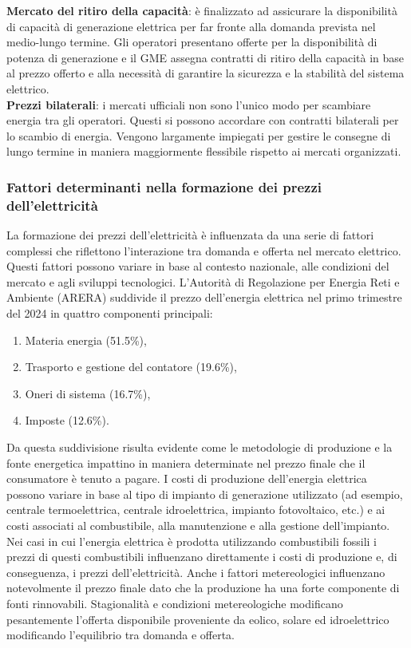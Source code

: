 \documentclass{article}
\begin{document}
\textbf{Mercato del ritiro della capacità}: è finalizzato ad assicurare la disponibilità di capacità di generazione elettrica per far fronte alla domanda prevista nel medio-lungo termine. Gli operatori presentano offerte per la disponibilità di potenza di generazione e il GME assegna contratti di ritiro della capacità in base al prezzo offerto e alla necessità di garantire la sicurezza e la stabilità del sistema elettrico.\\
\textbf{Prezzi bilaterali}: i mercati ufficiali non sono l’unico modo per scambiare energia tra gli operatori. Questi si possono accordare con contratti bilaterali per lo scambio di energia. Vengono largamente impiegati per gestire le consegne di lungo termine in maniera maggiormente flessibile rispetto ai mercati organizzati.\\
\subsubsection{Fattori determinanti nella formazione dei prezzi dell'elettricità}
La formazione dei prezzi dell'elettricità è influenzata da una serie di fattori complessi che riflettono l'interazione tra domanda e offerta nel mercato elettrico. Questi fattori possono variare in base al contesto nazionale, alle condizioni del mercato e agli sviluppi tecnologici. L’Autorità di Regolazione per Energia Reti e Ambiente (ARERA) suddivide il prezzo dell’energia elettrica nel primo trimestre del 2024 in quattro componenti principali:\cite{Area_Sito}
\begin{enumerate}
    \item Materia energia (51.5\%),
    \item Trasporto e gestione del contatore (19.6\%),
    \item Oneri di sistema (16.7\%),
    \item Imposte (12.6\%).
\end{enumerate}
Da questa suddivisione risulta evidente come le metodologie di produzione e la fonte energetica impattino in maniera determinate nel prezzo finale che il consumatore è tenuto a pagare. I costi di produzione dell'energia elettrica possono variare in base al tipo di impianto di generazione utilizzato (ad esempio, centrale termoelettrica, centrale idroelettrica, impianto fotovoltaico, etc.) e ai costi associati al combustibile, alla manutenzione e alla gestione dell'impianto. Nei casi in cui l'energia elettrica è prodotta utilizzando combustibili fossili i prezzi di questi combustibili influenzano direttamente i costi di produzione e, di conseguenza, i prezzi dell'elettricità. Anche i fattori metereologici influenzano notevolmente il prezzo finale dato che la produzione ha una forte componente di fonti rinnovabili. Stagionalità e condizioni metereologiche modificano pesantemente l’offerta disponibile proveniente da eolico, solare ed idroelettrico modificando l’equilibrio tra domanda e offerta.\\
\end{document}
